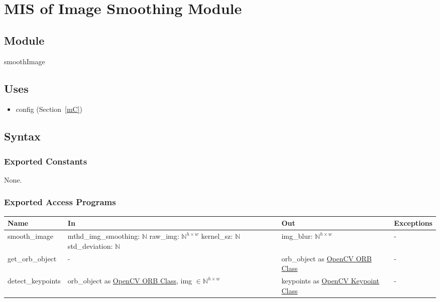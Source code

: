 \documentclass[12pt, titlepage]{article}
\begin{document}
\section{MIS of Image Smoothing Module} \label{mIS}

\subsection{Module}

smoothImage

\subsection{Uses}
\begin{itemize}
  \item config (Section~\ref{mC})
\end{itemize}

\subsection{Syntax}

\subsubsection{Exported Constants}
None.
\subsubsection{Exported Access Programs}
\begin{center}
  \begin{tabular}{p{4cm} p{4.5cm} p{4cm} p{2cm}}
  \hline
  \textbf{Name} & \textbf{In} & \textbf{Out} & \textbf{Exceptions} \\
  \hline
  smooth\_image
  & mthd\_img\_smoothing: $\mathbb{N}$ \newline
  raw\_img: $\mathbb{N}^{h \times w}$ \newline
  kernel\_sz: $\mathbb{N}$ \newline
  std\_deviation: $\mathbb{N}$
  & img\_blur: $\mathbb{N}^{h \times w}$
  & - \\
  \hline
  get\_orb\_object 
  & -
  & orb\_object as \href{https://docs.opencv.org/3.4/db/d95/classcv_1_1ORB.html}{OpenCV ORB Class}
  & - \\
  \hline
  detect\_keypoints 
  & orb\_object as \href{https://docs.opencv.org/3.4/db/d95/classcv_1_1ORB.html}{OpenCV ORB Class}, \newline
  img $\in \mathbb{N}^{h \times w}$
  & keypoints as \href{https://docs.opencv.org/3.4/d2/d29/classcv_1_1KeyPoint.html}{OpenCV Keypoint Class}
  & - \\
  \hline
  \end{tabular}
  \end{center}
\end{document}
